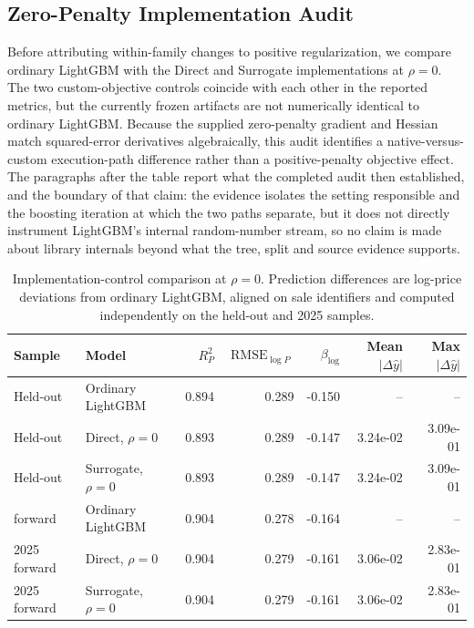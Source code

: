 \documentclass[10pt]{article}
\theoremstyle{definition}
\newcommand{\1}{\mathbf{1}}
\begin{document}
\subsection{Zero-Penalty Implementation Audit}
\label{subsec:zero_control_results}

Before attributing within-family changes to positive regularization, we compare ordinary LightGBM with the Direct and Surrogate implementations at $\rho=0$. The two custom-objective controls coincide with each other in the reported metrics, but the currently frozen artifacts are not numerically identical to ordinary LightGBM. Because the supplied zero-penalty gradient and Hessian match squared-error derivatives algebraically, this audit identifies a native-versus-custom execution-path difference rather than a positive-penalty objective effect. The paragraphs after the table report what the completed audit then established, and the boundary of that claim: the evidence isolates the setting responsible and the boosting iteration at which the two paths separate, but it does not directly instrument LightGBM's internal random-number stream, so no claim is made about library internals beyond what the tree, split and source evidence supports.

{\begin{table}[!ht]
\centering
\caption{Implementation-control comparison at $\rho=0$. Prediction differences are log-price deviations from ordinary LightGBM, aligned on sale identifiers and computed independently on the held-out and 2025 samples.}
\label{tab:rho_zero_control}
\begin{tabular}{llrrrrr}
\toprule
Sample & Model & $R^2_P$ & $\operatorname{RMSE}_{\log P}$ & $\beta_{\log}$ & Mean $|\Delta\widehat y|$ & Max $|\Delta\widehat y|$ \\
\midrule
Held-out & Ordinary LightGBM & 0.894 & 0.289 & -0.150 & -- & -- \\
Held-out & Direct, $\rho=0$ & 0.893 & 0.289 & -0.147 & 3.24e-02 & 3.09e-01 \\
Held-out & Surrogate, $\rho=0$ & 0.893 & 0.289 & -0.147 & 3.24e-02 & 3.09e-01 \\
\addlinespace
2025 forward & Ordinary LightGBM & 0.904 & 0.278 & -0.164 & -- & -- \\
2025 forward & Direct, $\rho=0$ & 0.904 & 0.279 & -0.161 & 3.06e-02 & 2.83e-01 \\
2025 forward & Surrogate, $\rho=0$ & 0.904 & 0.279 & -0.161 & 3.06e-02 & 2.83e-01 \\
\bottomrule
\end{tabular}
\end{table}
}
\end{document}
